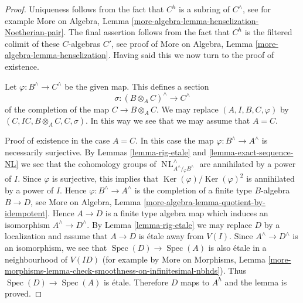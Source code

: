 \documentclass[10pt,a4paper]{amsart}
\theoremstyle{plain}
\theoremstyle{definition}
\theoremstyle{remark}
\numberwithin{equation}{subsection}
\def\Spec{\mathop{\mathrm{Spec}}}
\def\NL{\mathop{N\!L}\nolimits}
\def\Ker{\mathop{\mathrm{Ker}}}
\begin{document}
\begin{proof}
Uniqueness follows from the fact that $C^h$ is a subring of
$C^\wedge$, see for example
More on Algebra, Lemma \ref{more-algebra-lemma-henselization-Noetherian-pair}.
The final assertion follows from the fact that $C^h$ is the filtered colimit
of these $C$-algebras $C'$, see proof of
More on Algebra, Lemma \ref{more-algebra-lemma-henselization}.
Having said this we now turn to the proof of existence.

\medskip\noindent
Let $\varphi : B^\wedge \to C^\wedge$ be the given map.
This defines a section
$$
\sigma : (B \otimes_A C)^\wedge \longrightarrow C^\wedge
$$
of the completion of the map $C \to B \otimes_A C$. We may
replace $(A, I, B, C, \varphi)$ by $(C, IC, B \otimes_A C, C, \sigma)$.
In this way we see that we may assume that $A = C$.

\medskip\noindent
Proof of existence in the case $A = C$. In this case the map
$\varphi : B^\wedge \to A^\wedge$ is necessarily surjective.
By Lemmas \ref{lemma-rig-etale} and \ref{lemma-exact-sequence-NL}
we see that the cohomology groups of
$\NL_{A^\wedge/\!_\varphi B^\wedge}^\wedge$
are annihilated by a power of $I$. Since $\varphi$ is surjective,
this implies that $\Ker(\varphi)/\Ker(\varphi)^2$ is annihilated
by a power of $I$. Hence $\varphi : B^\wedge \to A^\wedge$
is the completion of a finite type $B$-algebra $B \to D$, see
More on Algebra, Lemma \ref{more-algebra-lemma-quotient-by-idempotent}.
Hence $A \to D$ is a finite type algebra map which induces an isomorphism
$A^\wedge \to D^\wedge$. By
Lemma \ref{lemma-rig-etale} we may replace $D$ by a localization
and assume that $A \to D$ is \'etale away from $V(I)$.
Since $A^\wedge \to D^\wedge$ is an isomorphism, we see that
$\Spec(D) \to \Spec(A)$ is also \'etale in a neighbourhood of $V(ID)$
(for example by
More on Morphisms, Lemma
\ref{more-morphisms-lemma-check-smoothness-on-infinitesimal-nbhds}).
Thus $\Spec(D) \to \Spec(A)$ is \'etale. Therefore $D$ maps to
$A^h$ and the lemma is proved.
\end{proof}
\end{document}
